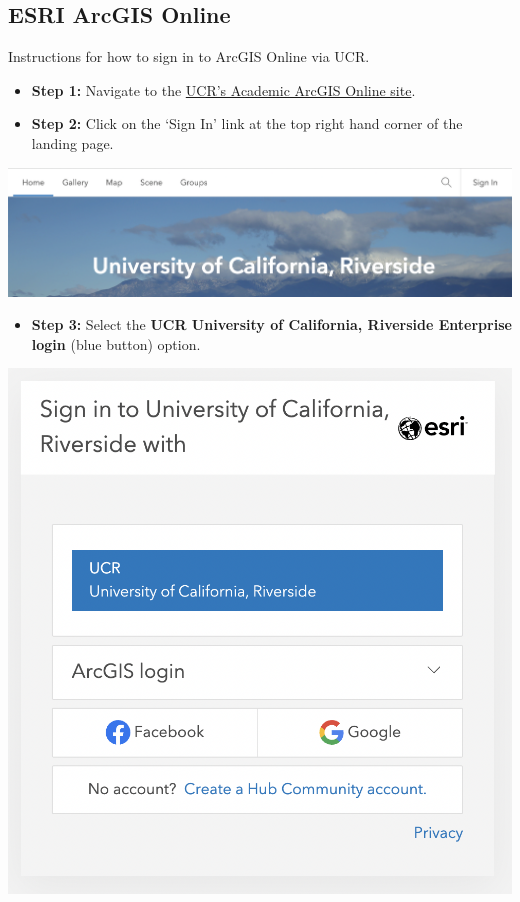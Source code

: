 \documentclass[
]{book}
\providecommand{\tightlist}{%
  \setlength{\itemsep}{0pt}\setlength{\parskip}{0pt}}
\begin{document}
\hypertarget{esri-arcgis-online}{%
\subsection{ESRI ArcGIS Online}\label{esri-arcgis-online}}

Instructions for how to sign in to ArcGIS Online via UCR.

\begin{itemize}
\item
  \textbf{Step 1:} Navigate to the \href{https://ucr.maps.arcgis.com/home/index.html}{UCR's Academic ArcGIS Online site}.
\item
  \textbf{Step 2:} Click on the `Sign In' link at the top right hand corner of the landing page.
\end{itemize}

\begin{center}\includegraphics{images/esri_arcgisonline} \end{center}

\begin{itemize}
\tightlist
\item
  \textbf{Step 3:} Select the \textbf{UCR University of California, Riverside Enterprise login} (blue button) option.
\end{itemize}

\begin{center}\includegraphics{images/esri_ucrenterprise} \end{center}
\end{document}
